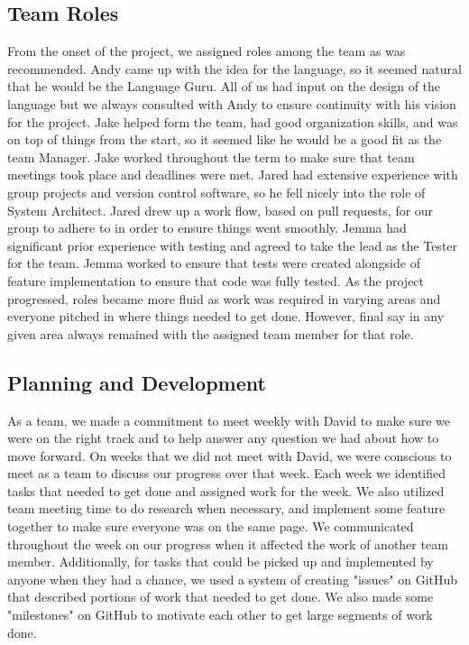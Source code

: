 \documentclass{article}
\begin{document}
\subsection{Team Roles}
From the onset of the project, we assigned roles among the team as was recommended.  Andy came up with the idea for the language, so it seemed natural that he would be the Language Guru.  All of us had input on the design of the language but we always consulted with Andy to ensure continuity with his vision for the project. Jake helped form the team, had good organization skills, and was on top of things from the start, so it seemed like he would be a good fit as the team Manager. Jake worked throughout the term to make sure that team meetings took place and deadlines were met.  Jared had extensive experience with group projects and version control software, so he fell nicely into the role of System Architect.  Jared drew up a work flow, based on pull requests, for our group to adhere to in order to ensure things went smoothly.  Jemma had significant prior experience with testing and agreed to take the lead as the Tester for the team.  Jemma worked to ensure that tests were created alongside of feature implementation to ensure that code was fully tested.  As the project progressed, roles became more fluid as work was required in varying areas and everyone pitched in where things needed to get done.  However, final say in any given area always remained with the assigned team member for that role.
\subsection{Planning and Development}
As a team, we made a commitment to meet weekly with David to make sure we were on the right track and to help answer any question we had about how to move forward.  On weeks that we did not meet with David, we were conscious to meet as a team to discuss our progress over that week.  Each week we identified tasks that needed to get done and assigned work for the week.  We also utilized team meeting time to do research when necessary, and implement some feature together to make sure everyone was on the same page.  We communicated throughout the week on our progress when it affected the work of another team member.  Additionally, for tasks that could be picked up and implemented by anyone when they had a chance, we used a system of creating "issues" on GitHub that described portions of work that needed to get done.  We also made some "milestones" on GitHub to motivate each other to get large segments of work done.
\end{document}
